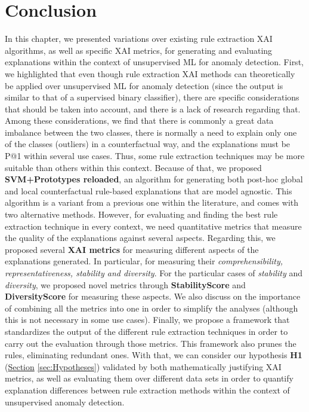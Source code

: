 \section{Conclusion}\label{sec:RuleExtractionConclusion}
In this chapter, we presented variations over existing rule extraction XAI algorithms, as well as specific XAI metrics, for generating and evaluating explanations within the context of unsupervised ML for anomaly detection.
First, we highlighted that even though rule extraction XAI methods can theoretically be applied over unsupervised ML for anomaly detection (since the output is similar to that of a supervised binary classifier), there are specific considerations that should be taken into account, and there is a lack of research regarding that. Among these considerations, we find that there is commonly a great data imbalance between the two classes, there is normally a need to explain only one of the classes (outliers) in a counterfactual way, and the explanations must be P@1 within several use cases. Thus, some rule extraction techniques may be more suitable than others within this context. 
Because of that, we proposed \textbf{SVM+Prototypes reloaded}, an algorithm for generating both post-hoc global and local counterfactual rule-based explanations that are model agnostic.  This algorithm is a variant from a previous one within the literature, and comes with two alternative methods.
However, for evaluating and finding the best rule extraction technique in every context, we need quantitative metrics that measure the quality of the explanations against several aspects. Regarding this, we proposed several \textbf{XAI metrics} for measuring different aspects of the explanations generated. In particular, for measuring their \textit{comprehensibility, representativeness, stability and diversity}. For the particular cases of \textit{stability} and \textit{diversity}, we proposed novel metrics through \textbf{StabilityScore} and \textbf{DiversityScore} for measuring these aspects. We also discuss on the importance of combining all the metrics into one in order to simplify the analyses (although this is not necessary in some use cases).
Finally, we propose a framework that standardizes the output of the different rule extraction techniques in order to carry out the evaluation through those metrics. This framework also prunes the rules, eliminating redundant ones.
With that, we can consider our hypothesis \textbf{H1} (\hyperref[sec:Hypotheses]{Section} \ref{sec:Hypotheses}) validated by both mathematically justifying XAI metrics, as well as evaluating them over different data sets in order to quantify explanation differences between rule extraction methods within the context of unsupervised anomaly detection.
